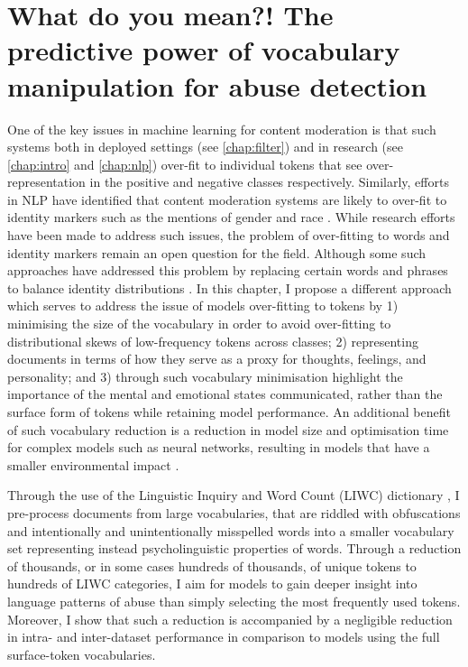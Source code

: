 \ifpdf
    \graphicspath{{Chapter5/Figs/Raster/}{Chapter5/Figs/PDF/}{Chapter5/Figs/}}
\else
    \graphicspath{{Chapter5/Figs/Vector/}{Chapter5/Figs/}}
\fi

\chapter{What do you mean?! The predictive power of vocabulary manipulation for abuse detection}\label{chap:liwc}

One of the key issues in machine learning for content moderation is that such systems both in deployed settings (see \cref{chap:filter}) and in research (see \cref{chap:intro} and \cref{chap:nlp}) over-fit to individual tokens that see over-representation in the positive and negative classes respectively.
Similarly, efforts in NLP have identified that content moderation systems are likely to over-fit to identity markers such as the mentions of gender and race \citep{Dixon:2018}.
While research efforts have been made to address such issues, the problem of over-fitting to words and identity markers remain an open question for the field. Although some such approaches have addressed this problem by replacing certain words and phrases to balance identity distributions \cite{Dixon:2018}.
In this chapter, I propose a different approach which serves to address the issue of models over-fitting to tokens by 1) minimising the size of the vocabulary in order to avoid over-fitting to distributional skews of low-frequency tokens across classes; 2) representing documents in terms of how they serve as a proxy for thoughts, feelings, and personality; and 3) through such vocabulary minimisation highlight the importance of the mental and emotional states communicated, rather than the surface form of tokens while retaining model performance.
An additional benefit of such vocabulary reduction is a reduction in model size and optimisation time for complex models such as neural networks, resulting in models that have a smaller environmental impact \citep{Strubell:2019}.

Through the use of the Linguistic Inquiry and Word Count (LIWC) dictionary \cite{Pennebaker:2015,Pennebaker:2001}, I pre-process documents from large vocabularies, that are riddled with obfuscations and intentionally and unintentionally misspelled words into a smaller vocabulary set representing instead psycholinguistic properties of words. 
Through a reduction of thousands, or in some cases hundreds of thousands, of unique tokens to hundreds of LIWC categories, I aim for models to gain deeper insight into language patterns of abuse than simply selecting the most frequently used tokens. 
Moreover, I show that such a reduction is accompanied by a negligible reduction in intra- and inter-dataset performance in comparison to models using the full surface-token vocabularies.

